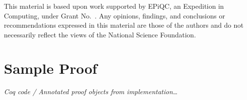 \documentclass[acmsmall,nonacm,timestamp]{acmart}
\begin{document}
\begin{acks}

	This material is based upon work supported by
	EPiQC, an 
	Expedition in Computing, under Grant
	No.~.  Any opinions, findings, and
	conclusions or recommendations expressed in this material are those
	of the authors and do not necessarily reflect the views of the
	National Science Foundation.
\end{acks}

\newpage



\newpage

\appendix
\section{Sample Proof}
\textit{Coq code / Annotated proof objects from implementation\ldots}
\end{document}
